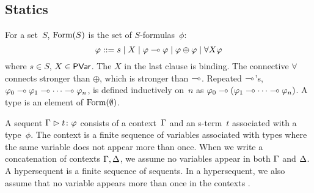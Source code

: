 \documentclass[envcountsame]{llncs}
\begin{document}


\subsection{Statics}
For a set~$S$,
$\mathop{\text{Form}}(S)$ is the set of $S$-formulas~$\phi$:
\[
\varphi::= s \mid X \mid \varphi\multimap\varphi\mid \varphi\oplus\varphi\mid
\forall X \varphi
\]
where $s\in S$, $X\in \mathsf{PVar}$. The $X$ in the
last clause is binding.
The connective $\forall$ connects stronger than $\oplus$, which is
stronger than $\multimap$.
Repeated $\multimap$'s,
$\varphi_0\multimap\varphi_1\multimap\cdots\multimap\varphi_n$, is defined inductively on~$n$
as
$\varphi_0\multimap(\varphi_1\multimap\cdots\multimap\varphi_n)$.
A type is an element of $\mathop{\text{Form}}(\emptyset)$.

A sequent ${\Gamma}\vartriangleright{ {t} \colon{\varphi} }$ consists of a
context~$\Gamma$ and an s-term~$t$ associated with a type~$\phi$.
The context is a finite sequence of variables associated
with types where the same variable does not appear more than once.
When we write a concatenation of contexts $\Gamma,\Delta$, we assume no variables
appear in both $\Gamma$ and $\Delta$.
A hypersequent is a finite sequence of sequents.
In a hypersequent, we also assume that no variable appears more than once in
the contexts%
.
\end{document}
